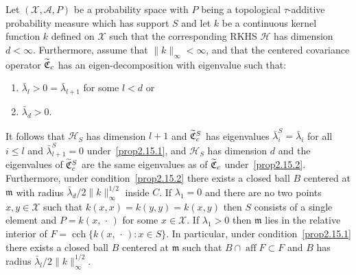 \documentclass[AHL,Unicode,longabstracts,published]{cedram}
\theoremstyle{remark}
\DeclareMathOperator{\cch}{cch}
\DeclareMathOperator{\aff}{aff}
\newcommand{\X}{\mathcal{X}}
\newcommand{\clA}{\mathcal{A}}
\newcommand{\cH}{\mathcal{H}}
\newcommand{\fkC}{\mathfrak{C}}
\newcommand{\mean}{\mathfrak{m}}
\newcommand*{\relabel}{\renewcommand{\labelenumi}{(\theenumi)}}
\newcommand*{\romanenumi}{\renewcommand*{\theenumi}{\roman{enumi}}\relabel}
\let\oldtilde\tilde
\renewcommand*{\tilde}[1]{\mathchoice{\widetilde{#1}}{\widetilde{#1}}{\oldtilde{#1}}{\oldtilde{#1}}}
\begin{document}
\begin{prop}\label{prop:data_dep_ball}
Let $(\X,\clA,P)$ be a probability space with $P$ being a topological $\tau$-additive probability measure which has support $S$ and let $k$ be a continuous kernel function $k$ defined on $\X$ such that the corresponding RKHS $\cH$ has dimension $d<\infty$. Furthermore, assume that $\|k\|_\infty < \infty$, and that the centered covariance operator $\tilde{\fkC}_c$ has an eigen-decomposition with eigenvalue such that:
\begin{enumerate}\romanenumi
\item\label{prop2.15.1} $\bar \lambda_{l} > 0 = \bar \lambda_{l+1}$ for some $l< d$ or 
\item\label{prop2.15.2} $ \bar \lambda_d > 0$.
\end{enumerate}
It follows that $\cH_S$ has dimension $l+1$ and $\tilde{\fkC}^S_c$ has eigenvalues $\bar \lambda^S_i = \bar \lambda_i$ for all $i\leq l$ and $\bar\lambda_{l+1}^S = 0$ under~\eqref{prop2.15.1}, and $\cH_S$ has dimension $d$ and the eigenvalues of $\tilde{\fkC}^S_c$ are the same eigenvalues as of $\tilde{\fkC}_c$ under~\eqref{prop2.15.2}. Furthermore, under condition~\eqref{prop2.15.2} there exists a closed ball $B$ centered at $\mean$ with radius $\bar \lambda_d/2 \|k\|_\infty^{1/2}$ inside $C$. If $\lambda_1 = 0$ and there are no two points $x,y \in \X$ such that $k(x,x) = k(y,y) =k(x,y)$ then $S$ consists of a single element and $P = k(x,\,\cdot\,)$ for some $x\in \X$. If $\lambda_1 > 0$ then $\mean$ lies in the relative interior of $F = \cch\{k(x,\,\cdot\,) : x \in S \}$. In particular, under condition~\eqref{prop2.15.1} there exists a closed ball $B$ centered at $\mean$ such that $B\cap \aff F \subset F$ and $B$ has radius $\bar \lambda_l / 2 \|k\|_\infty^{1/2}$.
\end{prop}
\goodbreak
\end{document}
